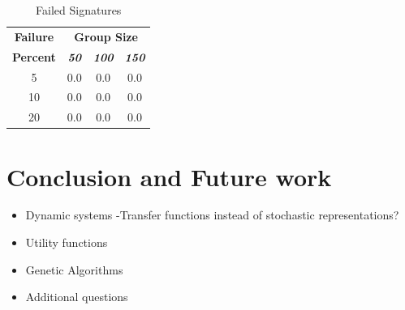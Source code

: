 \documentclass[conference]{IEEEtran}
\begin{document}
        \begin{table}[h!]
            \caption{Failed Signatures}
            \begin{center}
            \begin{tabular}{|c|c|c|c|}
            \hline
            \textbf{Failure}&\multicolumn{3}{|c|}{\textbf{Group Size}} \\
            \cline{2-4} 
            \textbf{Percent} & \textbf{\textit{50}}& \textbf{\textit{100}}& \textbf{\textit{150}} \\
            \hline
            5 &  0.0 &  0.0 &  0.0 \\
            \hline
            10 &  0.0 &  0.0 &  0.0 \\
            \hline
            20 &  0.0 &  0.0 &  0.0 \\
            \hline
            \end{tabular}
            \label{failed_table2}
            \end{center}
        \end{table}


\newpage
\section{Conclusion and Future work}
\begin{itemize}
\item Dynamic systems -Transfer functions instead of stochastic representations?
\item Utility functions
\item Genetic Algorithms
\item Additional questions
\end{itemize}



\end{document}
